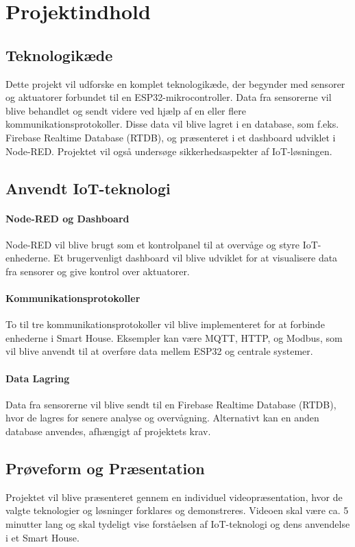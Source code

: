 \section*{Projektindhold}

\subsection*{Teknologikæde}
Dette projekt vil udforske en komplet teknologikæde, der begynder med sensorer og aktuatorer forbundet til en ESP32-mikrocontroller. Data fra sensorerne vil blive behandlet og sendt videre ved hjælp af en eller flere kommunikationsprotokoller. Disse data vil blive lagret i en database, som f.eks. Firebase Realtime Database (RTDB), og præsenteret i et dashboard udviklet i Node-RED. Projektet vil også undersøge sikkerhedsaspekter af IoT-løsningen.

\subsection*{Anvendt IoT-teknologi}

\paragraph{Node-RED og Dashboard}
Node-RED vil blive brugt som et kontrolpanel til at overvåge og styre IoT-enhederne. Et brugervenligt dashboard vil blive udviklet for at visualisere data fra sensorer og give kontrol over aktuatorer.

\paragraph{Kommunikationsprotokoller}
To til tre kommunikationsprotokoller vil blive implementeret for at forbinde enhederne i Smart House. Eksempler kan være MQTT, HTTP, og Modbus, som vil blive anvendt til at overføre data mellem ESP32 og centrale systemer.

\paragraph{Data Lagring}
Data fra sensorerne vil blive sendt til en Firebase Realtime Database (RTDB), hvor de lagres for senere analyse og overvågning. Alternativt kan en anden database anvendes, afhængigt af projektets krav.

\subsection*{Prøveform og Præsentation}
Projektet vil blive præsenteret gennem en individuel videopræsentation, hvor de valgte teknologier og løsninger forklares og demonstreres. Videoen skal være ca. 5 minutter lang og skal tydeligt vise forståelsen af IoT-teknologi og dens anvendelse i et Smart House.


